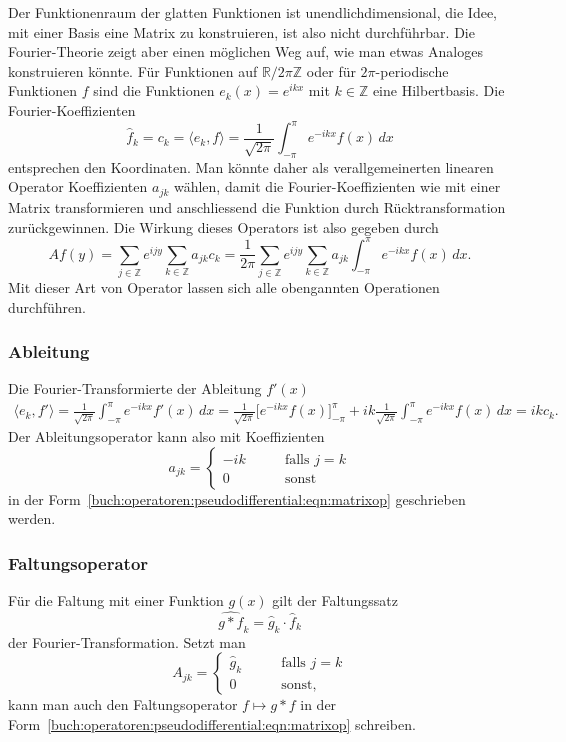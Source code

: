 Der Funktionenraum der glatten Funktionen ist unendlichdimensional, die
Idee, mit einer Basis eine Matrix zu konstruieren, ist also nicht
durchführbar.
Die Fourier-Theorie zeigt aber einen möglichen Weg auf, wie man etwas
Analoges konstruieren könnte.
Für Funktionen auf $\mathbb{R}/2\pi\mathbb{Z}$ oder für $2\pi$-periodische
Funktionen $f$ sind die Funktionen $e_k(x)=e^{ikx}$ mit $k\in\mathbb{Z}$ 
eine Hilbertbasis.
Die Fourier-Koeffizienten
\[
\hat{f}_k
=
c_k
=
\langle e_k,f\rangle
=
\frac{1}{\!\sqrt{2\pi}}
\int_{-\pi}^{\pi} e^{-ikx}f(x)\,dx
\]
entsprechen den Koordinaten.
Man könnte daher als verallgemeinerten linearen Operator Koeffizienten
$a_{jk}$ wählen, damit die Fourier-Koeffizienten wie mit einer Matrix
transformieren und anschliessend die Funktion durch Rücktransformation
zurückgewinnen.
Die Wirkung dieses Operators ist also gegeben durch
\begin{equation}
Af(y)
=
\sum_{j\in\mathbb{Z}}
e^{ijy}
\sum_{k\in\mathbb{Z}} a_{jk}
c_k
=
\frac{1}{2\pi}
\sum_{j\in\mathbb{Z}}
e^{ijy}
\sum_{k\in\mathbb{Z}} a_{jk}
\int_{-\pi}^\pi e^{-ikx} f(x)\,dx.
\label{buch:operatoren:pseudodifferential:eqn:matrixop}
\end{equation}
Mit dieser Art von Operator lassen sich alle obengannten Operationen
durchführen.

\subsubsection{Ableitung}
Die Fourier-Transformierte der Ableitung $f'(x)$
\begin{align*}
\langle e_k,f'\rangle
=
\frac{1}{\!\sqrt{2\pi}}
\int_{-\pi}^\pi e^{-ikx}f'(x)\,dx
=
\frac{1}{\!\sqrt{2\pi}}
\biggl[
e^{-ikx}
f(x)
\biggr]_{-\pi}^\pi
+ik
\frac{1}{\!\sqrt{2\pi}}
\int_{-\pi}^\pi e^{-ikx} f(x)\,dx
=
ikc_k.
\end{align*}
Der Ableitungsoperator kann also mit Koeffizienten
\[
a_{jk}
=
\begin{cases}
-ik&\qquad\text{falls $j=k$}\\
0  &\qquad\text{sonst}
\end{cases}
\]
in der Form~\eqref{buch:operatoren:pseudodifferential:eqn:matrixop}
geschrieben werden.

\subsubsection{Faltungsoperator}
Für die Faltung mit einer Funktion $g(x)$ gilt der Faltungssatz
\[
\widehat{g*f}_k
=
\hat{g}_k\cdot \hat{f}_k
\]
der Fourier-Transformation.
Setzt man
\[
A_{jk}
=
\begin{cases}
\hat{g}_k&\qquad\text{falls $j=k$}\\
0        &\qquad\text{sonst,}
\end{cases}
\]
kann man auch den Faltungsoperator $f\mapsto g*f$ in der 
Form~\eqref{buch:operatoren:pseudodifferential:eqn:matrixop}
schreiben.

